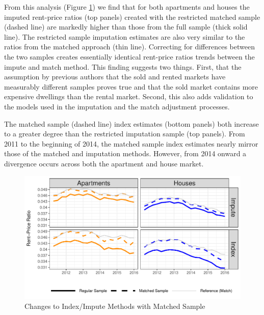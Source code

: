 \documentclass{article}\usepackage[]{graphicx}\usepackage[]{color}
\makeatletter
\def\maxwidth{ %
  \ifdim\Gin@nat@width>\linewidth
    \linewidth
  \else
    \Gin@nat@width
  \fi
}
\makeatother
\begin{document}
From this analysis (Figure \ref{fig:compplot}) we find that for both apartments and houses the imputed rent-price ratios (top panels) created with the restricted matched sample (dashed line) are markedly higher than those from the full sample (thick solid line).  The restricted sample imputation estimates are also very similar to the ratios from the matched approach (thin line). Correcting for differences between the two samples creates essentially identical rent-price ratios trends between the impute and match method.  This finding suggests two things.  First, that the assumption by previous authors \citep*{Himmelberg2005, glaeser2007arbitrage, verbrugge2008puzzling, garner2009reconciling} that the sold and rented markets have measurably different samples proves true and that the sold market contains more expensive dwellings than the rental market.  Second, this also adds validation to the models used in the imputation and the match adjustment processes.\par

The matched sample (dashed line) index estimates (bottom panels) both increase to a greater degree than the restricted imputation sample (top panels).  From 2011 to the beginning of 2014, the matched sample index estimates nearly mirror those of the matched and imputation methods.  However, from 2014 onward a divergence occurs across both the apartment and house market.\par







\begin{figure}
 \centering


\includegraphics[width=\maxwidth]{figure/comp_plot-1} 


\caption{Changes to Index/Impute Methods with Matched Sample}
\label{fig:compplot}
\end{figure}
\end{document}
